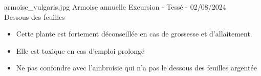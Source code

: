 {%
    armoise_vulgaris.jpg
}
{%
    Armoise annuelle
}
{%
    Excursion - Tessé - 02/08/2024\\Dessous des feuilles 
}

\begin{Remarque}
    \begin{itemize}[label = \bcplume]
        \item Cette plante est fortement déconseillée en cas de grossesse et d'allaitement.
        \item Elle est toxique en cas d'emploi prolongé
        \item Ne pas confondre avec l'ambroisie qui n'a pas le dessous des feuilles argentée
    \end{itemize}
\end{Remarque}